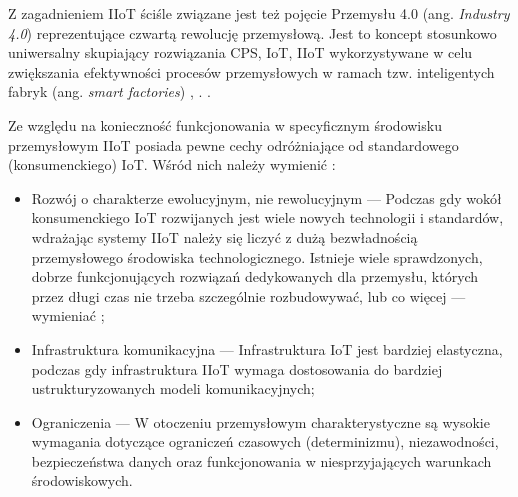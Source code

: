 \documentclass[a4paper, 12pt, twoside]{article}
\begin{document}
Z zagadnieniem IIoT ściśle związane jest też pojęcie Przemysłu 4.0 (ang. \emph{Industry 4.0})
reprezentujące czwartą rewolucję przemysłową. Jest to koncept stosunkowo uniwersalny
skupiający rozwiązania CPS, IoT, IIoT wykorzystywane w celu zwiększania efektywności
procesów przemysłowych w ramach tzw. inteligentych fabryk (ang. \emph{smart factories})
\cite{iiot-cyber-manufacturing-systems}, \cite{iiot-challenges-opportunities-directions}.
.

Ze względu na konieczność funkcjonowania w specyficznym środowisku przemysłowym
IIoT posiada pewne cechy odróżniające od standardowego (konsumenckiego) IoT.
Wśród nich należy wymienić \cite{iiot-challenges-opportunities-directions}:
\begin{itemize}
    \itemsep0em 
    \item Rozwój o charakterze ewolucyjnym, nie rewolucyjnym
    --- Podczas gdy wokół konsumenckiego IoT rozwijanych jest wiele nowych technologii i standardów, 
    wdrażając systemy IIoT należy się liczyć z dużą bezwładnością
    przemysłowego środowiska technologicznego. Istnieje wiele sprawdzonych, dobrze
    funkcjonujących rozwiązań dedykowanych dla przemysłu, których przez długi czas
    nie trzeba szczególnie rozbudowywać, lub co więcej --- wymieniać \cite{isp};
    \item Infrastruktura komunikacyjna 
    --- Infrastruktura IoT jest bardziej elastyczna, podczas gdy infrastruktura
    IIoT wymaga dostosowania do bardziej ustrukturyzowanych modeli komunikacyjnych;
    \item Ograniczenia
    --- W otoczeniu przemysłowym charakterystyczne są wysokie wymagania dotyczące
    ograniczeń czasowych (determinizmu), niezawodności, bezpieczeństwa danych oraz
    funkcjonowania w niesprzyjających warunkach środowiskowych.
\end{itemize}
\end{document}
